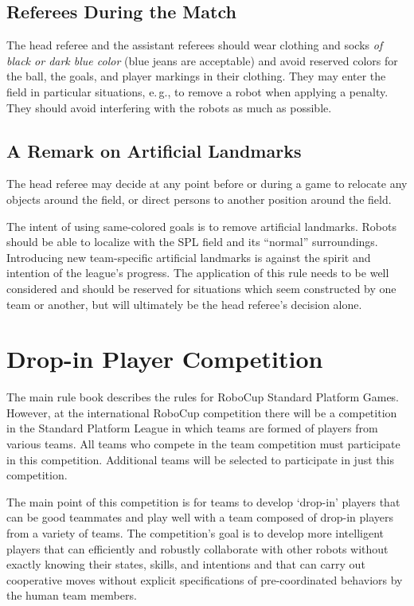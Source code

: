 \documentclass[12pt]{article}
\newcommand{\eg}{\mbox{e.\,g.}\xspace}
\begin{document}
\subsection{Referees During the Match}

The head referee and the assistant referees should wear clothing and socks \emph{of black or dark blue color} (blue jeans are acceptable) and avoid reserved colors for the ball, the goals, and player markings in their clothing. They may enter the field in particular situations, \eg, to remove a robot when applying a penalty. They should avoid interfering with the robots as much as possible.

\subsection{A Remark on Artificial Landmarks}
\label{sec:judgment:landmarks}

The head referee may decide at any point before or during a game to relocate any objects around the field, or direct persons to another position around the field.

The intent of using same-colored goals is to remove artificial landmarks.
Robots should be able to localize with the SPL field and its ``normal'' surroundings.
Introducing new team-specific artificial landmarks is against the spirit and intention of the league's progress.
The application of this rule needs to be well considered and should be reserved for situations which seem constructed by one team or another, but will ultimately be the head referee's decision alone.


\newpage


\appendix
\section{Drop-in Player Competition}
\label{sec:drop-in}
The main rule book describes the rules for RoboCup Standard Platform Games.  However, at the international RoboCup competition there will be a competition in the Standard Platform League in which teams are formed of players from various teams.  All teams who compete in the team competition must participate in this competition.  Additional teams will be selected to participate in just this competition.

The main point of this competition is for teams to develop `drop-in' players that can be good teammates and play well with a team composed of drop-in players from a variety of teams. The competition's goal is to develop more intelligent players that can efficiently and robustly collaborate with other robots without exactly knowing their states, skills, and intentions and that can carry out cooperative moves without explicit specifications of pre-coordinated behaviors by the human team members.
\end{document}
